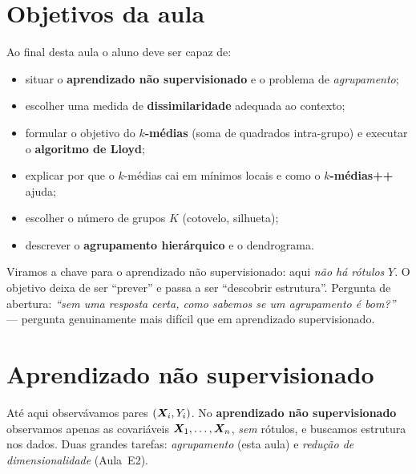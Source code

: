 \documentclass[11pt,a4paper]{article}
\begin{document}

\section*{Objetivos da aula}
Ao final desta aula o aluno deve ser capaz de:
\begin{itemize}[leftmargin=1.4cm]
  \item situar o \textbf{aprendizado não supervisionado} e o problema de
        \emph{agrupamento};
  \item escolher uma medida de \textbf{dissimilaridade} adequada ao contexto;
  \item formular o objetivo do \textbf{$k$-médias} (soma de quadrados intra-grupo)
        e executar o \textbf{algoritmo de Lloyd};
  \item explicar por que o $k$-médias cai em mínimos locais e como o
        \textbf{$k$-médias++} ajuda;
  \item escolher o número de grupos $K$ (cotovelo, silhueta);
  \item descrever o \textbf{agrupamento hierárquico} e o dendrograma.
\end{itemize}

\begin{emsala}
Viramos a chave para o aprendizado não supervisionado: aqui \emph{não há rótulos}
$Y$. O objetivo deixa de ser ``prever'' e passa a ser ``descobrir estrutura''.
Pergunta de abertura:
\emph{``sem uma resposta certa, como sabemos se um agrupamento é bom?''} ---
pergunta genuinamente mais difícil que em aprendizado supervisionado.
\end{emsala}

\section{Aprendizado não supervisionado}
Até aqui observávamos pares $(\bm{X}_i,Y_i)$. No \textbf{aprendizado não
supervisionado} observamos apenas as covariáveis $\bm{X}_1,\dots,\bm{X}_n$, \emph{sem}
rótulos, e buscamos estrutura nos dados. Duas grandes tarefas:
\emph{agrupamento} (esta aula) e \emph{redução de dimensionalidade} (Aula~E2).
\end{document}
